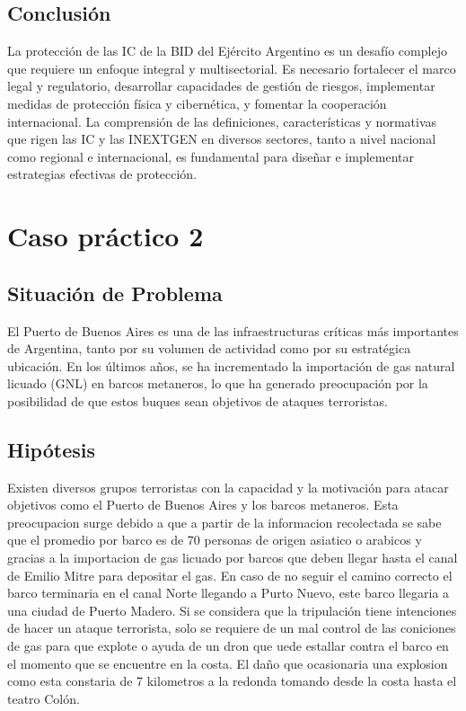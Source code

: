 \documentclass{article}
\begin{document}
\hypertarget{conclusiuxf3n}{%
\subsection{Conclusión}\label{conclusiuxf3n}}

La protección de las IC de la BID del Ejército Argentino es un desafío
complejo que requiere un enfoque integral y multisectorial. Es necesario
fortalecer el marco legal y regulatorio, desarrollar capacidades de
gestión de riesgos, implementar medidas de protección física y
cibernética, y fomentar la cooperación internacional. La comprensión de
las definiciones, características y normativas que rigen las IC y las
INEXTGEN en diversos sectores, tanto a nivel nacional como regional e
internacional, es fundamental para diseñar e implementar estrategias
efectivas de protección.

\hypertarget{caso-pruxe1ctico-2}{%
\section{Caso práctico 2}\label{caso-pruxe1ctico-2}}

\hypertarget{situaciuxf3n-de-problema}{%
\subsection{Situación de Problema}\label{situaciuxf3n-de-problema}}

El Puerto de Buenos Aires es una de las infraestructuras críticas más
importantes de Argentina, tanto por su volumen de actividad como por su
estratégica ubicación. En los últimos años, se ha incrementado la
importación de gas natural licuado (GNL) en barcos metaneros, lo que ha
generado preocupación por la posibilidad de que estos buques sean
objetivos de ataques terroristas.

\hypertarget{hipuxf3tesis}{%
\subsection{Hipótesis}\label{hipuxf3tesis}}

Existen diversos grupos terroristas con la capacidad y la motivación
para atacar objetivos como el Puerto de Buenos Aires y los barcos
metaneros. Esta preocupacion surge debido a que a partir de la
informacion recolectada se sabe que el promedio por barco es de 70
personas de origen asiatico o arabicos y gracias a la importacion de gas
licuado por barcos que deben llegar hasta el canal de Emilio Mitre para
depositar el gas. En caso de no seguir el camino correcto el barco
terminaria en el canal Norte llegando a Purto Nuevo, este barco llegaria
a una ciudad de Puerto Madero. Si se considera que la tripulación tiene
intenciones de hacer un ataque terrorista, solo se requiere de un mal
control de las coniciones de gas para que explote o ayuda de un dron que
uede estallar contra el barco en el momento que se encuentre en la
costa. El daño que ocasionaria una explosion como esta constaria de 7
kilometros a la redonda tomando desde la costa hasta el teatro Colón.
\end{document}
